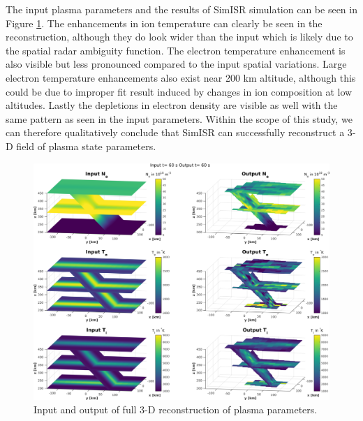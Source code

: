 \documentclass[draft,ras]{agutex}
\begin{document}
\begin{article}
The input plasma parameters and the results of SimISR simulation can be seen in Figure \ref{fig:3dparams}. The enhancements in ion temperature can clearly be seen in the reconstruction, although they do look wider than the input which is likely due to the spatial radar ambiguity function. 
The electron temperature enhancement is also visible but less pronounced compared to the input spatial variations. Large electron temperature enhancements also exist near 200 km altitude, although this could be due to improper fit result induced by changes in ion composition at low altitudes. Lastly the depletions in electron density are visible as well with the same pattern as seen in the input parameters.  Within the scope of this study, we can therefore qualitatively conclude that SimISR can successfully reconstruct a 3-D field of plasma state parameters.
\begin{figure}[!t]
\centering
\includegraphics[width=6in]{60_60}
\caption{Input and output of full 3-D reconstruction of plasma parameters.}
\label{fig:3dparams}
\end{figure}


\end{article}
\end{document}
